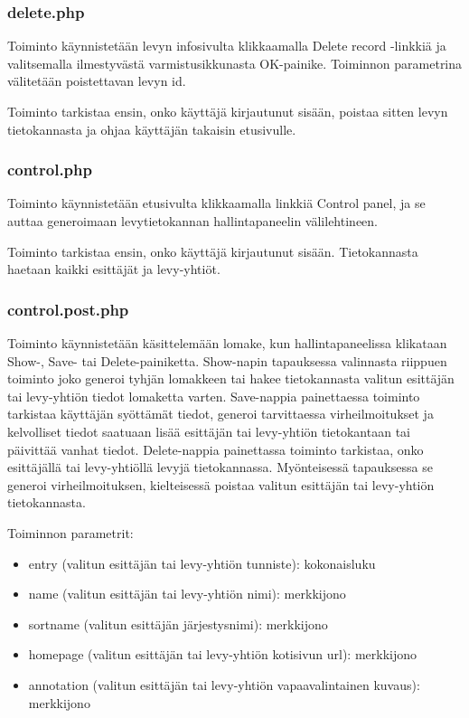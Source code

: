 \documentclass[a4paper,12pt]{report}
\begin{document}
\subsubsection{delete.php}

Toiminto käynnistetään levyn infosivulta klikkaamalla Delete record -linkkiä
ja valitsemalla ilmestyvästä varmistusikkunasta OK-painike. Toiminnon
parametrina välitetään poistettavan levyn id.

Toiminto tarkistaa ensin, onko käyttäjä kirjautunut sisään, poistaa sitten
levyn tietokannasta ja ohjaa käyttäjän takaisin etusivulle.

\subsubsection{control.php}

Toiminto käynnistetään etusivulta klikkaamalla linkkiä Control panel, ja se
auttaa generoimaan levytietokannan hallintapaneelin välilehtineen.

Toiminto tarkistaa ensin, onko käyttäjä kirjautunut sisään. Tietokannasta
haetaan kaikki esittäjät ja levy-yhtiöt.

\subsubsection{control.post.php}

Toiminto käynnistetään käsittelemään lomake, kun hallintapaneelissa
klikataan Show-, Save- tai Delete-painiketta.  Show-napin tapauksessa
valinnasta riippuen toiminto joko generoi tyhjän lomakkeen tai hakee
tietokannasta valitun esittäjän tai levy-yhtiön tiedot lomaketta varten.
Save-nappia painettaessa toiminto tarkistaa käyttäjän syöttämät tiedot,
generoi tarvittaessa virheilmoitukset ja kelvolliset tiedot saatuaan lisää
esittäjän tai levy-yhtiön tietokantaan tai päivittää vanhat tiedot.
Delete-nappia painettassa toiminto tarkistaa, onko esittäjällä tai
levy-yhtiöllä levyjä tietokannassa. Myönteisessä tapauksessa se generoi
virheilmoituksen, kielteisessä poistaa valitun esittäjän tai levy-yhtiön
tietokannasta.

Toiminnon parametrit:
\begin{itemize}
  \item entry (valitun esittäjän tai levy-yhtiön tunniste): kokonaisluku
  \item name (valitun esittäjän tai levy-yhtiön nimi): merkkijono
  \item sortname (valitun esittäjän järjestysnimi): merkkijono
  \item homepage (valitun esittäjän tai levy-yhtiön kotisivun url): merkkijono
  \item annotation (valitun esittäjän tai levy-yhtiön vapaavalintainen
    kuvaus): merkkijono
\end{itemize}
\end{document}
